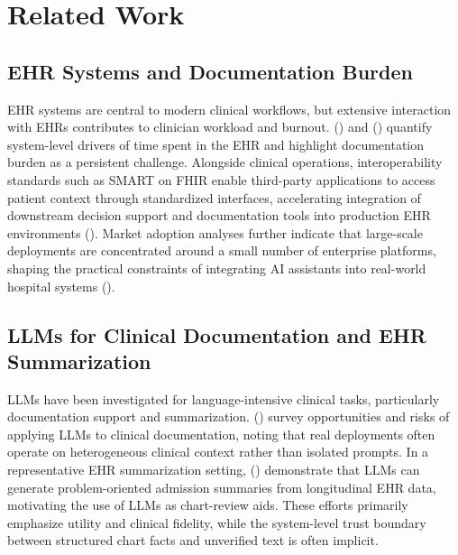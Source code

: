 \documentclass[letterpaper]{article}
\begin{document}
\section{Related Work}

\subsection{EHR Systems and Documentation Burden}
EHR systems are central to modern clinical workflows, but extensive interaction with EHRs contributes to clinician workload and burnout. \citeauthor{rotenstein2023ehr} (\citeyear{rotenstein2023ehr}) and \citeauthor{murad2024ehr} (\citeyear{murad2024ehr}) quantify system-level drivers of time spent in the EHR and highlight documentation burden as a persistent challenge. Alongside clinical operations, interoperability standards such as SMART on FHIR enable third-party applications to access patient context through standardized interfaces, accelerating integration of downstream decision support and documentation tools into production EHR environments \citeauthor{mandel2016smart} (\citeyear{mandel2016smart}). Market adoption analyses further indicate that large-scale deployments are concentrated around a small number of enterprise platforms, shaping the practical constraints of integrating AI assistants into real-world hospital systems \citeauthor{klas2024marketshare} (\citeyear{klas2024marketshare}).

\subsection{LLMs for Clinical Documentation and EHR Summarization}
LLMs have been investigated for language-intensive clinical tasks, particularly documentation support and summarization. \citeauthor{woo2025clinicalllm} (\citeyear{woo2025clinicalllm}) survey opportunities and risks of applying LLMs to clinical documentation, noting that real deployments often operate on heterogeneous clinical context rather than isolated prompts. In a representative EHR summarization setting, \citeauthor{verma2025ehrsummary} (\citeyear{verma2025ehrsummary}) demonstrate that LLMs can generate problem-oriented admission summaries from longitudinal EHR data, motivating the use of LLMs as chart-review aids. These efforts primarily emphasize utility and clinical fidelity, while the system-level trust boundary between structured chart facts and unverified text is often implicit.
\end{document}
